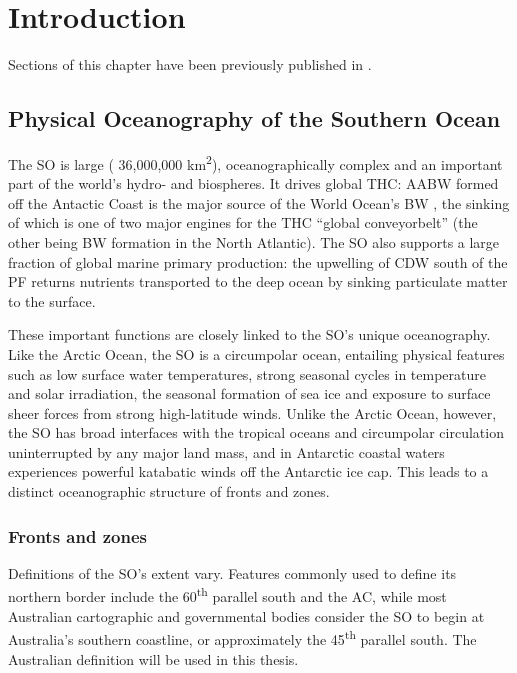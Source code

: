 \chapter{Introduction} 
\label{ch:intro}

Sections of this chapter have been previously published in .

\section{Physical Oceanography of the Southern Ocean}

The \ac{SO} is large (\textapprox{} 36,000,000 km\textsuperscript{2}), oceanographically complex and an important part of the world's hydro- and biospheres.
It drives global \ac{THC}: \ac{AABW} formed off the Antactic Coast is the major source of the World Ocean's \ac{BW} \cite{Jacobs:2004hv}, the sinking of which is one of two major engines for the \ac{THC} ``global conveyorbelt'' (the other being \ac{BW} formation in the North Atlantic).
The \ac{SO} also supports a large fraction of global marine primary production: the upwelling of \ac{CDW} south of the \ac{PF} returns nutrients transported to the deep ocean by sinking particulate matter \cite{Rath:1998wm} to the surface.

These important functions are closely linked to the \ac{SO}'s unique oceanography.
Like the Arctic Ocean, the \ac{SO} is a circumpolar ocean, entailing physical features such as low surface water temperatures, strong seasonal cycles in temperature and solar irradiation, the seasonal formation of sea ice and exposure to surface sheer forces from strong high-latitude winds.
Unlike the Arctic Ocean, however, the \ac{SO} has broad interfaces with the tropical oceans and circumpolar circulation uninterrupted by any major land mass, and in Antarctic coastal waters experiences powerful katabatic winds off the Antarctic ice cap.
This leads to a distinct oceanographic structure of fronts and zones.

\subsection{Fronts and zones}
Definitions of the \ac{SO}'s extent vary.
Features commonly used to define its northern border include the 60\textsuperscript{th} parallel south and the \ac{AC}, while most Australian cartographic and governmental bodies consider the \ac{SO} to begin at Australia's southern coastline, or approximately the 45\textsuperscript{th} parallel south.
The Australian definition will be used in this thesis.

